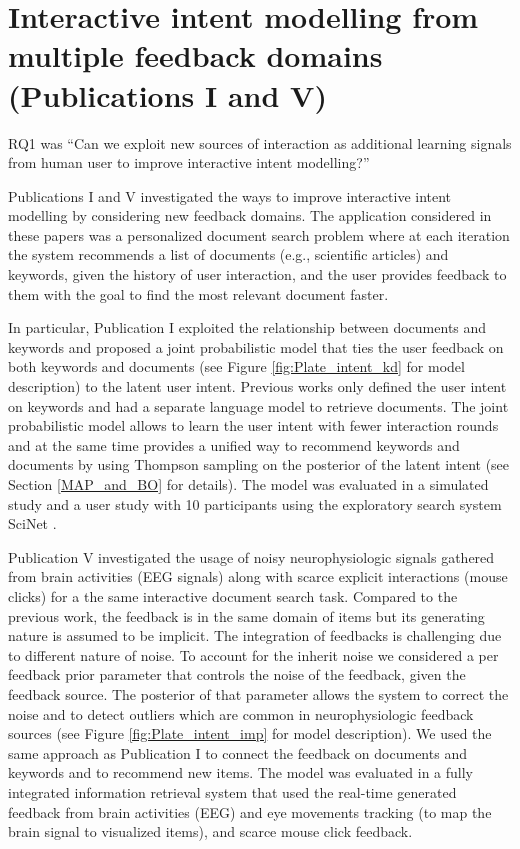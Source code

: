 \documentclass[dissertation,math,vertlayout,pdfa,colorlinks]{aaltoseries}
\begin{document}
\section{Interactive intent modelling from multiple feedback domains (Publications I and V)}


RQ1 was ``Can we exploit new sources of interaction as additional learning signals from human user to improve interactive intent modelling?''

Publications I and V investigated the ways to improve interactive intent modelling by considering new feedback domains. The application considered in these papers was a personalized document search problem where at each iteration the system recommends a list of documents (e.g., scientific articles) and keywords, given the history of user interaction, and the user provides feedback to them with the goal to find the most relevant document faster.

In particular, Publication I exploited the relationship between documents and keywords and proposed a joint probabilistic model that ties the user feedback on both keywords and documents (see Figure \ref{fig:Plate_intent_kd} for model description) to the latent user intent. Previous works \cite{GlowIUI2013,ruotsalo2015interactive} only defined the user intent on keywords and had a separate language model to retrieve documents. The joint probabilistic model allows to learn the user intent with fewer interaction rounds and at the same time provides a unified way to recommend keywords and documents by using Thompson sampling on the posterior of the latent intent (see Section \ref{MAP_and_BO} for details). The model was evaluated in a simulated study and a user study with 10 participants using the exploratory search system SciNet \cite{GlowIUI2013}. 

Publication V investigated the usage of noisy neurophysiologic signals gathered from brain activities (EEG signals) along with scarce explicit interactions (mouse clicks) for a the same interactive document search task. Compared to the previous work, the feedback is in the same domain of items but its generating nature is assumed to be implicit. The integration of feedbacks is challenging due to different nature of noise. To account for the inherit noise we considered a per feedback prior parameter that controls the noise of the feedback, given the feedback source. The posterior of that parameter allows the system to correct the noise and to detect outliers which are common in neurophysiologic feedback sources (see Figure \ref{fig:Plate_intent_imp} for model description). We used the same approach as Publication I to connect the feedback on documents and keywords and to recommend new items. The model was evaluated in a fully integrated information retrieval system that used the real-time generated feedback from brain activities (EEG) and  eye movements tracking (to map the brain signal to visualized items), and scarce mouse click feedback.  
\end{document}
